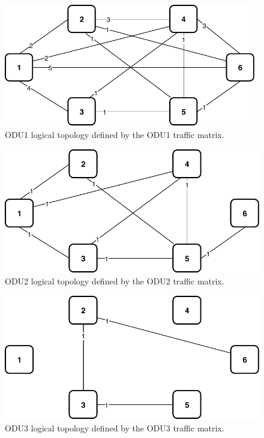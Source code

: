 \begin{figure}[h!]
\centering
\includegraphics[width=11cm]{sdf/ilp/transparent_protection/figures/logical_topology_ODU1_low}
\caption{ODU1 logical topology defined by the ODU1 traffic matrix.}
\label{logical2_ODU1_protectionlow}
\end{figure}
\newpage
\begin{figure}[h!]
\centering
\includegraphics[width=12cm]{sdf/ilp/transparent_protection/figures/logical_topology_ODU2_low}
\caption{ODU2 logical topology defined by the ODU2 traffic matrix.}
\label{logical2_ODU2_protectionlow}
\end{figure}

\begin{figure}[h!]
\centering
\includegraphics[width=12cm]{sdf/ilp/transparent_protection/figures/logical_topology_ODU3_low}
\caption{ODU3 logical topology defined by the ODU3 traffic matrix.}
\label{logical2_ODU3_protectionlow}
\end{figure}

